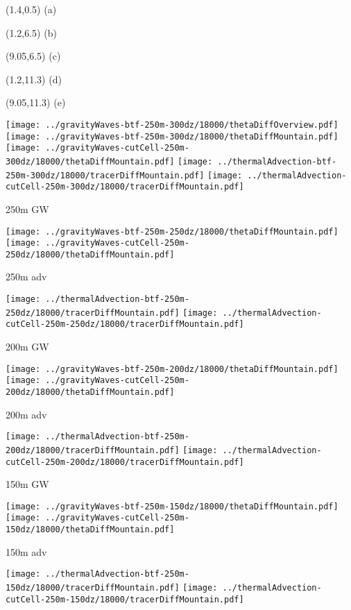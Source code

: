 \documentclass{article}
\begin{document}
\TPMargin{3pt}
\begin{textblock}{0.75}(1.4,0.5)
	\normalsize
	\centering
	(a)
\end{textblock}
\begin{textblock}{0.75}(1.2,6.5)
	\normalsize
	\centering
	(b)
\end{textblock}
\begin{textblock}{0.75}(9.05,6.5)
	\normalsize
	\centering
	(c)
\end{textblock}
\begin{textblock}{0.75}(1.2,11.3)
	\normalsize
	\centering
	(d)
\end{textblock}
\begin{textblock}{0.75}(9.05,11.3)
	\normalsize
	\centering
	(e)
\end{textblock}
\centering
\texttt{[image: ../gravityWaves-btf-250m-300dz/18000/thetaDiffOverview.pdf]}
\vspace*{0.1in}
\texttt{[image: ../gravityWaves-btf-250m-300dz/18000/thetaDiffMountain.pdf]}
\texttt{[image: ../gravityWaves-cutCell-250m-300dz/18000/thetaDiffMountain.pdf]}
\texttt{[image: ../thermalAdvection-btf-250m-300dz/18000/tracerDiffMountain.pdf]}
\texttt{[image: ../thermalAdvection-cutCell-250m-300dz/18000/tracerDiffMountain.pdf]}

\newpage

250m GW

\texttt{[image: ../gravityWaves-btf-250m-250dz/18000/thetaDiffMountain.pdf]}
\texttt{[image: ../gravityWaves-cutCell-250m-250dz/18000/thetaDiffMountain.pdf]}

250m adv

\texttt{[image: ../thermalAdvection-btf-250m-250dz/18000/tracerDiffMountain.pdf]}
\texttt{[image: ../thermalAdvection-cutCell-250m-250dz/18000/tracerDiffMountain.pdf]}

\newpage
200m GW

\texttt{[image: ../gravityWaves-btf-250m-200dz/18000/thetaDiffMountain.pdf]}
\texttt{[image: ../gravityWaves-cutCell-250m-200dz/18000/thetaDiffMountain.pdf]}

200m adv

\texttt{[image: ../thermalAdvection-btf-250m-200dz/18000/tracerDiffMountain.pdf]}
\texttt{[image: ../thermalAdvection-cutCell-250m-200dz/18000/tracerDiffMountain.pdf]}

\newpage

150m GW

\texttt{[image: ../gravityWaves-btf-250m-150dz/18000/thetaDiffMountain.pdf]}
\texttt{[image: ../gravityWaves-cutCell-250m-150dz/18000/thetaDiffMountain.pdf]}

150m adv

\texttt{[image: ../thermalAdvection-btf-250m-150dz/18000/tracerDiffMountain.pdf]}
\texttt{[image: ../thermalAdvection-cutCell-250m-150dz/18000/tracerDiffMountain.pdf]}
\end{document}
